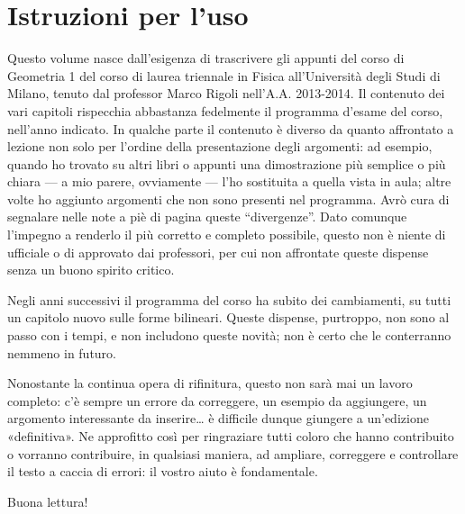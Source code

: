 \chapter{Istruzioni per l'uso}
Questo volume nasce dall'esigenza di trascrivere gli appunti del corso di Geometria 1 del corso di laurea triennale in Fisica all'Università degli Studi di Milano, tenuto dal professor Marco Rigoli nell'A.A. 2013-2014.
Il contenuto dei vari capitoli rispecchia abbastanza fedelmente il programma d'esame del corso, nell'anno indicato.
In qualche parte il contenuto è diverso da quanto affrontato a lezione non solo per l'ordine della presentazione degli argomenti: ad esempio, quando ho trovato su altri libri o appunti una dimostrazione più semplice o più chiara --- a mio parere, ovviamente --- l'ho sostituita a quella vista in aula; altre volte ho aggiunto argomenti che non sono presenti nel programma.
Avrò cura di segnalare nelle note a piè di pagina queste ``divergenze''.
Dato comunque l'impegno a renderlo il più corretto e completo possibile, questo non è niente di ufficiale o di approvato dai professori, per cui non affrontate queste dispense senza un buono spirito critico.

Negli anni successivi il programma del corso ha subito dei cambiamenti, su tutti un capitolo nuovo sulle forme bilineari.
Queste dispense, purtroppo, non sono al passo con i tempi, e non includono queste novità; non è certo che le conterranno nemmeno in futuro.

Nonostante la continua opera di rifinitura, questo non sarà mai un lavoro completo: c'è sempre un errore da correggere, un esempio da aggiungere, un argomento interessante da inserire\ldots{} è difficile dunque giungere a un'edizione «definitiva».
Ne approfitto cos\`i per ringraziare tutti coloro che hanno contribuito o vorranno contribuire, in qualsiasi maniera, ad ampliare, correggere e controllare il testo a caccia di errori: il vostro aiuto è fondamentale.

Buona lettura!

